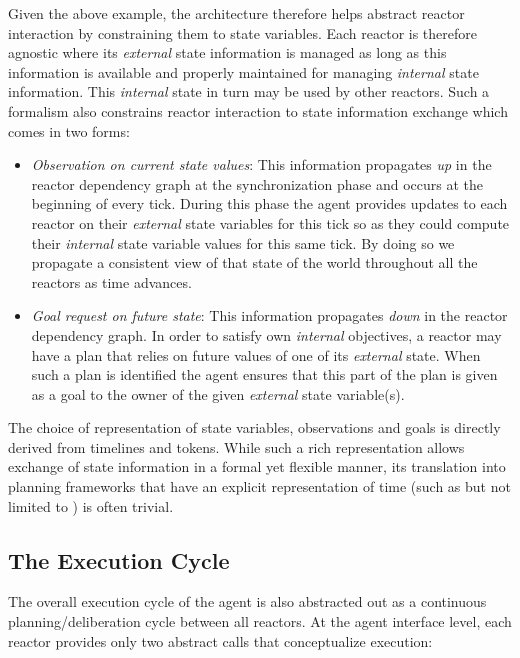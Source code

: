 Given the above example, the \rx architecture therefore helps abstract
reactor interaction by constraining them to state variables. Each
reactor is therefore agnostic where its {\em external} state
information is managed as long as this information is available and
properly maintained for managing {\em internal} state
information. This {\em internal} state in turn may be used by other
reactors. Such a formalism also constrains reactor interaction to
state information exchange which comes in two forms:

\begin{itemize}

\item {\em Observation on current state values}: This information
  propagates \emph{up} in the reactor dependency graph at the
  synchronization phase and occurs at the beginning of every
  tick. During this phase the agent provides updates to each reactor
  on their {\em external} state variables for this tick so as they
  could compute their {\em internal} state variable values for this
  same tick. By doing so we propagate a consistent view of that state
  of the world throughout all the reactors as time
  advances. 

\item {\em Goal request on future state}: This information propagates
  \emph{down} in the reactor dependency graph. In order to satisfy own
  {\em internal} objectives, a reactor may have a plan that relies on
  future values of one of its {\em external} state. When such a plan
  is identified the agent ensures that this part of the plan is given
  as a goal to the owner of the given {\em external} state
  variable(s). 

\end{itemize}

The choice of representation of state variables, observations and
goals is directly derived from \eu timelines and tokens.  While such a
rich representation allows exchange of state information in a formal
yet flexible manner, its translation into planning frameworks that
have an explicit representation of time (such as but not limited to
\eu) is often trivial.

\subsection{The Execution Cycle}
\label{sec:arch:exec}

The overall execution cycle of the agent is also abstracted out as a
continuous planning/deliberation cycle between all reactors. At the
agent interface level, each reactor provides only two abstract calls
that conceptualize execution:

